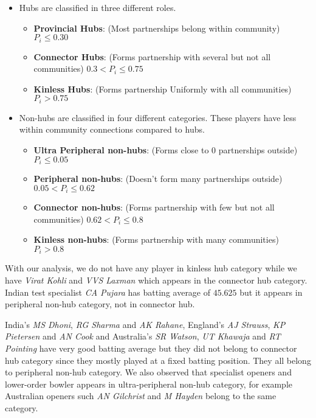 \documentclass{article}
\begin{document}
\begin{itemize}
    \item Hubs are classified in three different roles.
    \begin{itemize}
        \item \textbf{Provincial Hubs}: (Most partnerships belong within community) $P_i \leq 0.30$ 
        \item \textbf{Connector Hubs}: (Forms partnership with several but not all communities) $0.3 < P_i \leq 0.75$
        \item \textbf{Kinless Hubs}: (Forms partnership Uniformly with all communities) $P_i > 0.75$
    \end{itemize}
    \item Non-hubs are classified in four different categories. These players have less within community connections compared to hubs.
    \begin{itemize}
        \item \textbf{Ultra Peripheral non-hubs}: (Forms close to 0 partnerships outside) $P_i \leq 0.05$
        \item \textbf{Peripheral non-hubs}: (Doesn't form many partnerships outside) $0.05 < P_i \leq 0.62$
        \item \textbf{Connector non-hubs}: (Forms partnership with few but not all communities) $0.62 < P_i \leq 0.8$
        \item \textbf{Kinless non-hubs}: (Forms partnership with many communities) $P_i > 0.8$
    \end{itemize}
\end{itemize}


With our analysis, we do not have any player in kinless hub category while we have \textit{Virat Kohli} and \textit{VVS Laxman} which appears in the connector hub category. Indian test specialist \textit{CA Pujara} has batting average of $45.625$ but it appears in peripheral non-hub category, not in connector hub. 

India's \textit{MS Dhoni}, \textit{RG Sharma} and \textit{AK Rahane}, England's \textit{AJ Strauss}, \textit{KP Pietersen} and \textit{AN Cook} and Australia's \textit{SR Watson}, \textit{UT Khawaja} and \textit{RT Pointing} have very good batting average but they did not belong to connector hub category since they mostly played at a fixed batting position. They all belong to peripheral non-hub category. We also observed that specialist openers and lower-order bowler appears in ultra-peripheral non-hub category, for example Australian openers such \textit{AN Gilchrist} and \textit{M Hayden} belong to the same category.   
\end{document}
